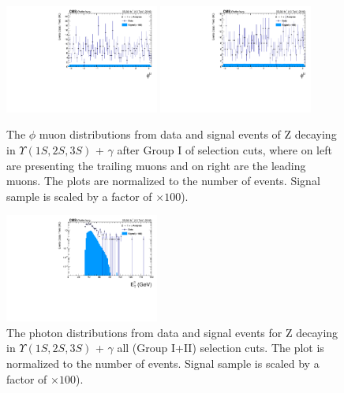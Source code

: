 \begin{figure}[!htbp]
\begin{center}
\includegraphics[width=0.45\textwidth]{figures/outputPlots/ZtoUpsilon_Cat0_ZZZZZ/nEvts/data_x_mc/withKinCuts/h_withKin_TrailingMu_phi}\hspace*{1.cm}
\includegraphics[width=0.45\textwidth]{figures/outputPlots/ZtoUpsilon_Cat0_ZZZZZ/nEvts/data_x_mc/withKinCuts/h_withKin_LeadingMu_phi}
\end{center}\vspace*{-.5cm}
\caption{The $\phi$ muon distributions from data and signal events of Z decaying in $\Upsilon(1S,2S,3S)$ + $\gamma$ after Group I of selection cuts, where on left are presenting the trailing muons and on right are the leading muons. The plots are normalized to the number of events. Signal sample is scaled by a factor of $\times 100$).}
\label{fig:phiMuons_ZtoUpsilon_Cat0_groupI_plus_II}
\end{figure}


\begin{figure}[!htbp]
\begin{center}
\includegraphics[width=0.45\textwidth]{figures/outputPlots/ZtoUpsilon_Cat0_ZZZZZ/nEvts/data_x_mc/withKinCuts/h_withKin_Photon_pt}\hspace*{1.cm}
\end{center}\vspace*{-.5cm}
\caption{The \PT photon distributions from data and signal events for Z decaying in $\Upsilon(1S,2S,3S)$ + $\gamma$ all (Group I+II) selection cuts. The plot is normalized to the number of events. Signal sample is scaled by a factor of $\times 100$).}
\label{fig:pTPhoton_ZtoUpsilon_Cat0_groupI_plus_II}
\end{figure}


